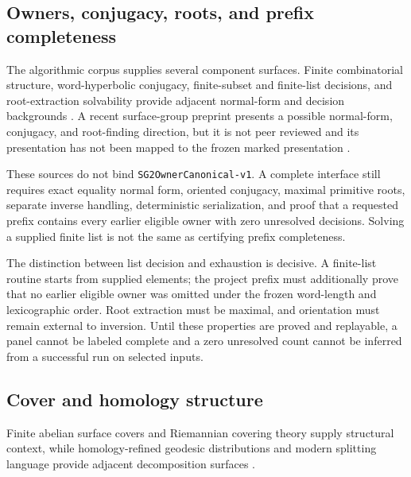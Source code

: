 \documentclass[11pt]{article}
\begin{document}
\hypertarget{21-owners-conjugacy-roots-and-prefix-completeness}{%
\subsection{Owners, conjugacy, roots, and prefix
completeness}\label{21-owners-conjugacy-roots-and-prefix-completeness}}

The algorithmic corpus supplies several component surfaces. Finite
combinatorial structure, word-hyperbolic conjugacy, finite-subset and
finite-list decisions, and root-extraction solvability provide adjacent
normal-form and decision backgrounds
\citep{P32-S01,P32-S02,P32-S03,P32-S04,P32-S05}.
A recent surface-group preprint presents a possible normal-form,
conjugacy, and root-finding direction, but it is not peer reviewed and
its presentation has not been mapped to the frozen marked presentation
\citep{P32-S06}.

These sources do not bind \texttt{SG2OwnerCanonical-v1}. A complete
interface still requires exact equality normal form, oriented conjugacy,
maximal primitive roots, separate inverse handling, deterministic
serialization, and proof that a requested prefix contains every earlier
eligible owner with zero unresolved decisions. Solving a supplied finite
list is not the same as certifying prefix completeness.

The distinction between list decision and exhaustion is decisive. A
finite-list routine starts from supplied elements; the project prefix
must additionally prove that no earlier eligible owner was omitted
under the frozen word-length and lexicographic order. Root extraction
must be maximal, and orientation must remain external to inversion.
Until these properties are proved and replayable, a panel cannot be
labeled complete and a zero unresolved count cannot be inferred from a
successful run on selected inputs.

\hypertarget{22-cover-and-homology-structure}{%
\subsection{Cover and homology
structure}\label{22-cover-and-homology-structure}}

Finite abelian surface covers and Riemannian covering theory supply
structural context, while homology-refined geodesic distributions and
modern splitting language provide adjacent decomposition surfaces
\citep{P32-S07,P32-S08,P32-S09,P32-S10,P32-S11,P32-S12}.
\end{document}
